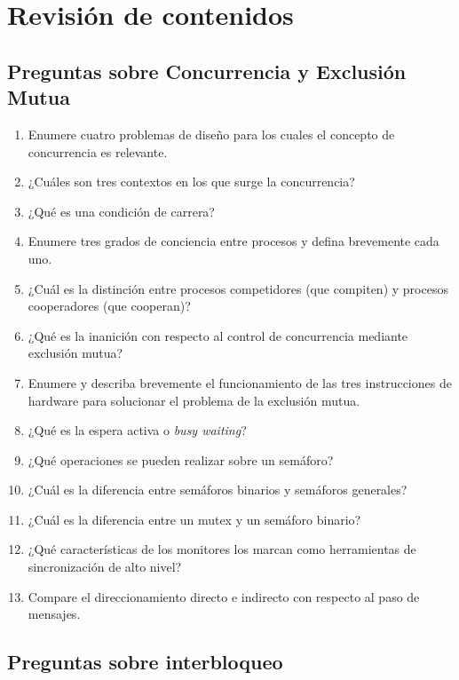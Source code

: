 \section{Revisión de contenidos}

\subsection{Preguntas sobre Concurrencia y Exclusión Mutua}

\begin{enumerate}
  \item Enumere cuatro problemas de diseño para los cuales el concepto de concurrencia es relevante.
  \item ¿Cuáles son tres contextos en los que surge la concurrencia?
  \item ¿Qué es una condición de carrera?
  \item Enumere tres grados de conciencia entre procesos y defina brevemente cada uno.
  \item ¿Cuál es la distinción entre procesos competidores (que compiten) y procesos cooperadores (que cooperan)?
  \item ¿Qué es la inanición con respecto al control de concurrencia mediante exclusión mutua?
  \item Enumere y describa brevemente el funcionamiento de las tres instrucciones de hardware para solucionar el problema de la exclusión mutua.
  \item ¿Qué es la espera activa o \emph{busy waiting}?
  \item ¿Qué operaciones se pueden realizar sobre un semáforo?
  \item ¿Cuál es la diferencia entre semáforos binarios y semáforos generales?
  \item ¿Cuál es la diferencia entre un mutex y un semáforo binario?
  \item ¿Qué características de los monitores los marcan como herramientas de sincronización de alto nivel?
  \item Compare el direccionamiento directo e indirecto con respecto al paso de mensajes.
\end{enumerate}

\subsection{Preguntas sobre interbloqueo}

